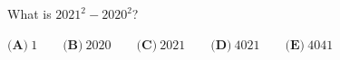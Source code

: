 What is $2021^2-2020^2$?

$\textbf{(A)}\ 1\qquad\textbf{(B)}\ 2020\qquad\textbf{(C)}\ 2021\qquad\textbf{(D)}\ 4021\qquad\textbf{(E)}\ 4041$
